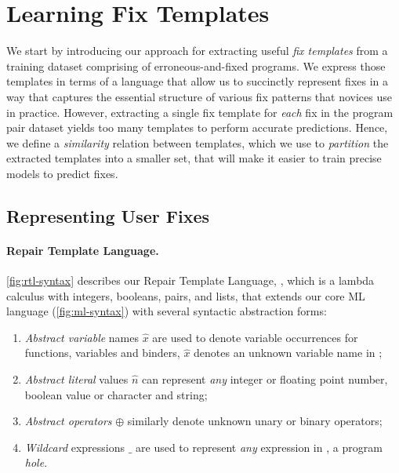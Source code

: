 \section{Learning Fix Templates}
\label{sec:templ-partition}

We start by introducing our approach for extracting useful \emph{fix templates}
from a training dataset comprising of erroneous-and-fixed programs.
%
We express those templates in terms of a language that allow us to succinctly
represent fixes in a way that captures the essential structure of various fix
patterns that novices use in practice.
%
However, extracting a single fix template for \emph{each} fix in the program
pair dataset yields too many templates to perform accurate predictions.
%
Hence, we define a \emph{similarity} relation between templates, which we use to
\emph{partition} the extracted templates into a smaller set, that will make it
easier to train precise models to predict fixes.



\subsection{Representing User Fixes}
\label{sec:templ-partition:lang}

\paragraph{Repair Template Language.}
\autoref{fig:rtl-syntax} describes our Repair Template Language, \repairLang,
which is a lambda calculus with integers, booleans, pairs, and lists, that
extends our core ML language \lang (\autoref{fig:ml-syntax}) with several
syntactic abstraction forms:

\begin{enumerate}
    \item \emph{Abstract variable} names $\hat{x}$  are used to denote variable
    occurrences for functions, variables and binders, \ie $\hat{x}$ denotes
    an unknown variable name in \repairLang;

    \item \emph{Abstract literal} values $\hat{n}$ can represent \emph{any}
    integer or floating point number, boolean value or character and string;

    \item \emph{Abstract operators} $\oplus$ similarly denote unknown unary or
    binary operators;

    \item \emph{Wildcard} expressions $\_$ are used to represent \emph{any}
    expression in \repairLang, \ie a program \emph{hole}.
\end{enumerate}

